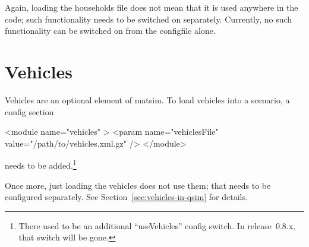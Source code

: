 Again, loading the households file does not mean that it is used anywhere in the code; such functionality needs to be switched on separately.  Currently, no such functionality can be switched on from the \gls{configfile} alone.



\section{Vehicles}
\label{sec:extending-vehicles}

Vehicles are an optional element of \gls{matsim}. To load vehicles into a scenario, a config section
\begin{xml}
<module name="vehicles" >
   <param name="vehiclesFile" value="/path/to/vehicles.xml.gz" />
</module>
\end{xml}
needs to be added.\footnote{%
%
There used to be an additional ``useVehicles'' config switch.  In release~0.8.x, that switch will be gone.
%
}

Once more, just loading the vehicles does not use them; that needs to be configured separately.  
See Section~\ref{sec:vehicles-in-qsim} for details.




